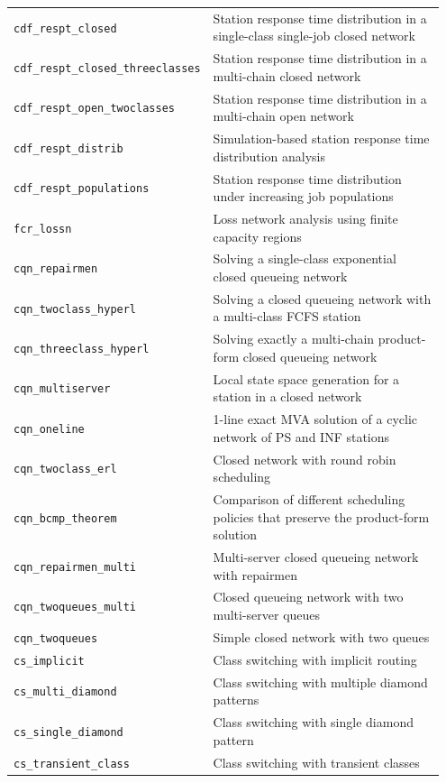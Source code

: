 \begin{footnotesize}
\begin{longtable}{|p{0.35\linewidth}|p{0.60\linewidth}|}
\hline
\texttt{cdf\_respt\_closed} &  Station response time distribution in a single-class single-job closed network\\
\texttt{cdf\_respt\_closed\_threeclasses} &  Station response time distribution in a multi-chain closed network\\
\texttt{cdf\_respt\_open\_twoclasses} &  Station response time distribution in a multi-chain open network\\
\texttt{cdf\_respt\_distrib} &  Simulation-based station response time distribution analysis\\
\texttt{cdf\_respt\_populations} &  Station response time distribution under increasing job populations\\
\hline
\texttt{fcr\_lossn} & Loss network analysis using finite capacity regions\\
\hline
\texttt{cqn\_repairmen} &  Solving a single-class exponential closed queueing network\\
\texttt{cqn\_twoclass\_hyperl} &  Solving a closed queueing network with a multi-class FCFS station\\
\texttt{cqn\_threeclass\_hyperl} &  Solving exactly a multi-chain product-form closed queueing network\\
\texttt{cqn\_multiserver} &  Local state space generation for a station in a closed network\\
\texttt{cqn\_oneline} &  1-line exact MVA solution of a cyclic network of PS and INF stations\\
\texttt{cqn\_twoclass\_erl} &  Closed network with round robin scheduling\\
\texttt{cqn\_bcmp\_theorem} &  Comparison of different scheduling policies that preserve the product-form solution\\
\texttt{cqn\_repairmen\_multi} &  Multi-server closed queueing network with repairmen\\
\texttt{cqn\_twoqueues\_multi} &  Closed queueing network with two multi-server queues\\
\texttt{cqn\_twoqueues} &  Simple closed network with two queues\\
\hline
\texttt{cs\_implicit} &  Class switching with implicit routing\\
\texttt{cs\_multi\_diamond} & Class switching with multiple diamond patterns\\
\texttt{cs\_single\_diamond} & Class switching with single diamond pattern\\
\texttt{cs\_transient\_class} & Class switching with transient classes\\

\end{longtable}
\end{footnotesize}
